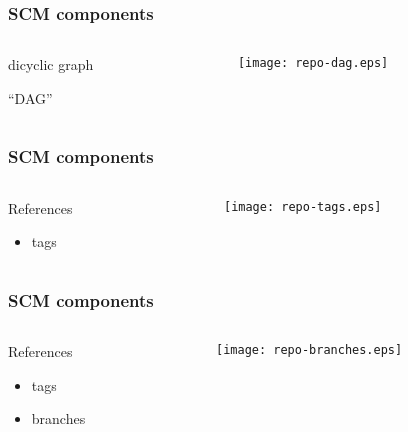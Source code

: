 \documentclass[english]{beamer}
\begin{document}
\begin{frame}
\frametitle{SCM components}
\begin{columns}[t]
        \begin{column}[T]{.5\textwidth}
                dicyclic graph

                \vspace{.1\textheight}
                ``DAG''
        \end{column}
        \begin{column}[T]{.5\textwidth}
                \vspace{.2\textheight}
                \texttt{[image: repo-dag.eps]}
        \end{column}
\end{columns}

\end{frame}

\begin{frame}
\frametitle{SCM components}
\begin{columns}[t]
        \begin{column}[T]{.5\textwidth}
                References
                \begin{itemize}
                        \item tags
                \end{itemize}
        \end{column}
        \begin{column}[T]{.5\textwidth}
                \vspace{.2\textheight}
                \texttt{[image: repo-tags.eps]}
        \end{column}
\end{columns}

\end{frame}

\begin{frame}
\frametitle{SCM components}
\begin{columns}[t]
        \begin{column}[T]{.5\textwidth}
                References
                \begin{itemize}
                        \item tags
                        \item branches
                \end{itemize}
        \end{column}
        \begin{column}[T]{.5\textwidth}
                \vspace{.2\textheight}
                \texttt{[image: repo-branches.eps]}
        \end{column}
\end{columns}

\end{frame}
\end{document}
